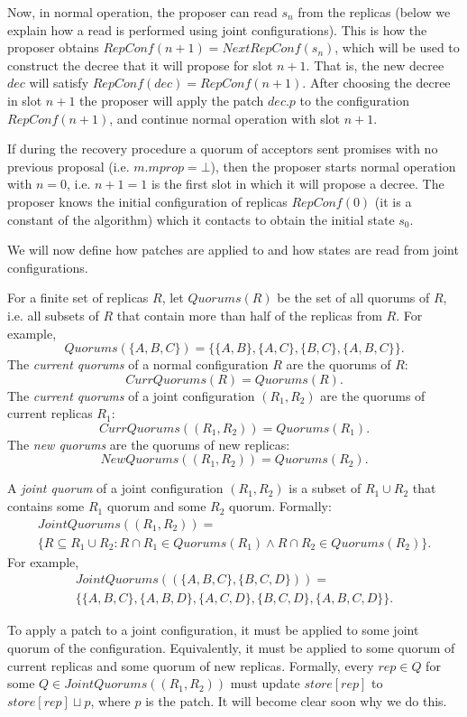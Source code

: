 \documentclass[12pt,a4paper,en]{pracamgr}
\newcommand{\ti}[1]{\textit{#1}}
\begin{document}
Now, in normal operation, the proposer can read $s_n$ from the replicas (below we explain how a read is performed using joint configurations). This is how the proposer obtains $RepConf(n+1) = NextRepConf(s_n)$, which will be used to construct the decree that it will propose for slot $n + 1$. That is, the new decree $dec$ will satisfy $RepConf(dec) = RepConf(n+1)$. After choosing the decree in slot $n+1$ the proposer will apply the patch $dec.p$ to the configuration $RepConf(n+1)$, and continue normal operation with slot $n+1$.

If during the recovery procedure a quorum of acceptors sent promises with no previous proposal (i.e. $m.mprop = \bot$), then the proposer starts normal operation with $n = 0$, i.e. $n+1 = 1$ is the first slot in which it will propose a decree. The proposer knows the initial configuration of replicas $RepConf(0)$ (it is a constant of the algorithm) which it contacts to obtain the initial state $s_0$.

We will now define how patches are applied to and how states are read from joint configurations.

For a finite set of replicas $R$, let $Quorums(R)$ be the set of all quorums of $R$, i.e. all subsets of $R$ that contain more than half of the replicas from $R$. For example,
$$ Quorums(\{A, B, C\}) = \{\{A, B\}, \{A, C\}, \{B, C\}, \{A, B, C\}\}. $$
The \ti{current quorums} of a normal configuration $R$ are the quorums of $R$:
$$ CurrQuorums(R) = Quorums(R). $$
The \ti{current quorums} of a joint configuration $(R_1, R_2)$ are the quorums of current replicas $R_1$:
$$ CurrQuorums((R_1, R_2)) = Quorums(R_1). $$
The \ti{new quorums} are the quorums of new replicas:
$$ NewQuorums((R_1, R_2)) = Quorums(R_2). $$

A \ti{joint quorum} of a joint configuration $(R_1, R_2)$ is a subset of $R_1 \cup R_2$ that contains some $R_1$ quorum and some $R_2$ quorum. Formally:
\begin{multline*}
    JointQuorums((R_1, R_2)) =\\
    \{R \subseteq R_1 \cup R_2: R \cap R_1 \in Quorums(R_1) \land R \cap R_2 \in Quorums(R_2)\}.
\end{multline*}
For example,
\begin{multline*}
JointQuorums((\{A, B, C\}, \{B, C, D\})) =\\
    \{\{A, B, C\}, \{A, B, D\}, \{A, C, D\}, \{B, C, D\}, \{A, B, C, D\}\}.
\end{multline*}

To apply a patch to a joint configuration, it must be applied to some joint quorum of the configuration. Equivalently, it must be applied to some quorum of current replicas and some quorum of new replicas. Formally, every $rep \in Q$ for some $Q \in JointQuorums((R_1, R_2))$ must update $store[rep]$ to $store[rep] \sqcup p$, where $p$ is the patch. It will become clear soon why we do this.
\end{document}
